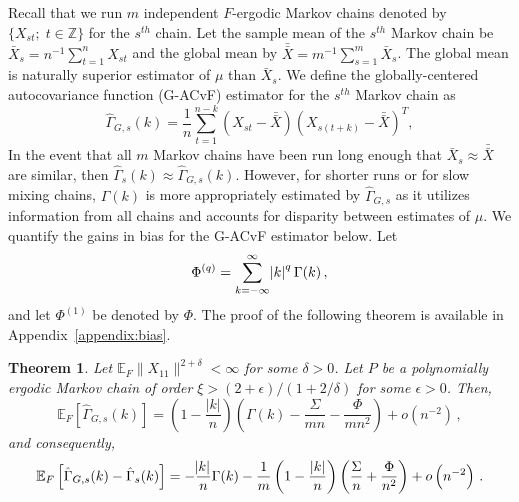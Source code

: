 \documentclass[11pt]{article}
\newcommand{\E}{\mathbb{E}}
\newtheorem{theorem}{Theorem}
\theoremstyle{remark}
\begin{document}
Recall that we run $m$ independent $F$-ergodic Markov chains denoted by $\{X_{st}; \; t \in \mathbb{Z}\}$ for the $s^{th}$ chain. Let the sample mean of the $s^{th}$ Markov chain be $\bar{X}_s = n^{-1} \sum_{t=1}^{n} X_{st}$ and the global mean by $\bar{\bar{X}} = m^{-1}\sum_{s = 1}^{m}\bar{X}_s$. The global mean is naturally superior estimator of $\mu$ than $\bar{X}_s$. We define the globally-centered autocovariance function (G-ACvF) estimator for the $s^{th}$ Markov chain as
%
\[
\hat{\Gamma}_{G,s}(k) = \dfrac{1}{n} \sum_{t=1}^{n-k}(X_{st}-\bar{\bar{X}})(X_{s(t+k)}-\bar{\bar{X}})^T,
\]
In the event that all $m$ Markov chains have been run long enough that $\bar{X}_s \approx \bar{\bar{X}}$ are similar, then  $\hat{\Gamma}_{s} (k) \approx \hat{\Gamma}_{G,s}(k)$. However, for shorter runs or for slow mixing chains, $\Gamma(k)$ is more appropriately estimated by $\hat{\Gamma}_{G,s}$ as it utilizes information from all chains and accounts for disparity between estimates of $\mu$. We quantify the gains in  bias  for the G-ACvF estimator below.
Let 
\[
\Phi^{(q)} = \sum_{ k= -\infty}^{\infty}\abs{k}^q \Gamma(k)\,,
\]
and let $\Phi^{(1)}$ be denoted by $\Phi$.  The proof of the following theorem is available in Appendix~\ref{appendix:bias}.

\begin{theorem} \label{th:G-_expec} Let $\E_F \|X_{11}\|^{2 + \delta} < \infty$ for some $\delta > 0$. Let $P$ be a  polynomially ergodic Markov chain of order $\xi > (2 + \epsilon)/(1 + 2/\delta)$ for some $\epsilon > 0$. Then,
\[
   \mathbb{E}_F\left[\hat{\Gamma}_{G,s}(k) \right] = \left(1- \dfrac{|k|}{n}\right) \left(\Gamma(k) - \dfrac{\Sigma}{mn} - \dfrac{\Phi}{mn^2}\right)  + o \left(n^{-2} \right)\,,
\]
and consequently,
\[
\mathbb{E}_F\left[\hat{\Gamma}_{G,s}(k) - \hat{\Gamma}_s(k) \right] = -\dfrac{\abs{k}}{n}\Gamma(k) - \dfrac{1}{m}\left(1- \dfrac{|k|}{n}\right)\left(\dfrac{\Sigma}{n} + \dfrac{\Phi}{n^2}\right) + o\left(n^{-2} \right)\,. 
\]
\end{theorem}
\end{document}
